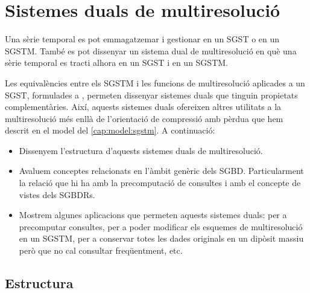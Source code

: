 













\chapter{Sistemes duals de multiresolució}
\label{sec:multiresolucio:dual}


Una sèrie temporal es pot emmagatzemar i gestionar en un \gls{SGST} o
en un \gls{SGSTM}. També es pot dissenyar un sistema dual de
multiresolució en què una sèrie temporal es tracti alhora en un \gls{SGST}
i en un \gls{SGSTM}.

Les equivalències entre els \gls{SGSTM} i les funcions de
multiresolució aplicades a un \gls{SGST}, formulades a
, permeten dissenyar sistemes duals
que tinguin propietats complementàries.  Així, aquests sistemes duals
ofereixen altres utilitats a la multiresolució més enllà de
l'orientació de compressió amb pèrdua que hem descrit en el model del
\autoref{cap:model:sgstm}. 
% 
A continuació:
\begin{itemize}
\item Dissenyem l'estructura d'aquests sistemes duals de multiresolució.
\item Avaluem conceptes relacionats en l'àmbit genèric dels
  \gls{SGBD}. Particularment la relació que hi ha amb la precomputació
  de consultes i amb el concepte de vistes dels \glspl{SGBDR}.
\item Mostrem algunes aplicacions que permeten aquests sistemes duals:
  per a precomputar consultes, per a poder modificar els esquemes de
  multiresolució en un \gls{SGSTM}, per a conservar totes les dades
  originals en un dipòsit massiu però que no cal consultar
  freqüentment, etc.
\end{itemize}





\section{Estructura}

